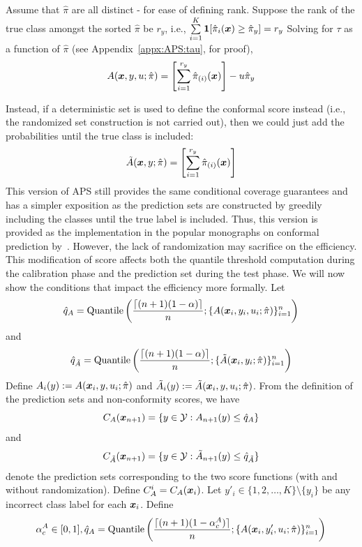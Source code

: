 Assume that $\hat{\pi}$ are all distinct - for ease of defining rank.
Suppose the rank of the true class amongst the sorted $\hat{\pi}$ be $r_y$, i.e., $\sum\limits_{i=1}^K \bm{1}[\hat{\pi}_i({\bm{x}}) \geq \hat{\pi}_{y}] = r_y$
Solving for $\tau$ as a function of $\hat{\pi}$  (see Appendix~\ref{appx:APS:tau}, for proof),
\begin{align}
A({\bm{x}}, y, u;\hat{\pi}) = \left[ \sum\limits_{i=1}^{r_y} \hat{\pi}_{(i)}({\bm{x}}) \right] - u \hat{\pi}_{y}
\end{align}

Instead, if a deterministic set is used to define the conformal score instead (i.e., the randomized set construction is not carried out), then we could just add the probabilities until the true class is included:
\begin{align}
    \Tilde{A}({\bm{x}}, y;\hat{\pi}) = \left[ \sum\limits_{i=1}^{r_y} \hat{\pi}_{(i)}({\bm{x}}) \right]
\end{align}
This version of APS still provides the same conditional coverage guarantees and has a simpler exposition as the prediction sets are constructed by greedily including the classes until the true label is included.
 Thus, this version is provided as the implementation in the popular monographs on conformal prediction by~\citet{angelopoulos2021gentle, angelopoulos2023conformal}.
However, the lack of randomization may sacrifice on the efficiency. 
This modification of score affects both the quantile threshold computation during the calibration phase and the prediction set during the test phase.
We will now show the conditions that impact the efficiency more formally.
Let 
\[
    \hat{q}_{A} = \text{Quantile}\left(\frac{\lceil(n+1)(1-\alpha)\rceil}{n}; \{A({\bm{x}}_i, y_i, u_i; \hat{\pi})\}_{i=1}^{n}\right)
\]
and
\[
    \hat{q}_{\Tilde{A}} = \text{Quantile}\left(\frac{\lceil(n+1)(1-\alpha)\rceil}{n}; \{\Tilde{A}({\bm{x}}_i, y_i; \hat{\pi})\}_{i=1}^{n}\right)
\]
Define $A_i(y) := A({\bm{x}}_i, y, u_i; \hat{\pi})$ and $\Tilde{A}_i(y) := \Tilde{A}({\bm{x}}_i, y, u_i; \hat{\pi})$. From the definition of the prediction sets and non-conformity scores, we have 
\[
    C_A({\bm{x}}_{n+1}) = \{y \in {\mathcal{Y}}: A_{n+1}(y) \leq \hat{q}_{A}\}
\] and 
\[
    C_{\Tilde{A}}({\bm{x}}_{n+1}) = \{y \in {\mathcal{Y}}: \Tilde{A}_{n+1}(y) \leq \hat{q}_{\Tilde{A}}\}
\] 
denote the prediction sets corresponding to the two score functions (with and without randomization).
Define $C_{A}^{i} = C_{A}({\bm{x}}_{i})$. 
Let $y'_i \in \{1, 2, \dots, K\} \setminus \{y_i\}$ be any incorrect class label for each ${\bm{x}}_i$.
Define 
\[
    \alpha_c^A \in [0, 1], \hat{q}_A = \text{Quantile}\left( \frac{\lceil(n+1)(1 - \alpha_c^A)\rceil}{n}; \{A({\bm{x}}_i, y'_i, u_i; \hat{\pi})\}_{i=1}^n \right)
\]

